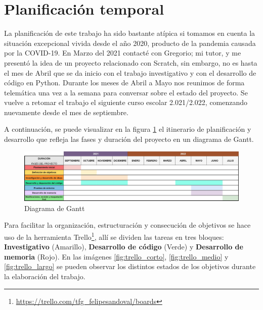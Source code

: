 \documentclass[a4paper, 12pt]{book}
\begin{document}
\section{Planificación temporal}
\label{sec:planificacion-temporal}


La planificación de este trabajo ha sido bastante atípica si tomamos en cuenta la situación excepcional vivida desde el año 2020, producto de la pandemia causada por la COVID-19. En Marzo del 2021 contacté con Gregorio; mi tutor, y me presentó la idea de un proyecto relacionado con Scratch, sin embargo, no es hasta el mes de Abril que se da inicio con el trabajo investigativo y con el desarrollo de código en Python. Durante los meses de Abril a Mayo nos reunimos de forma telemática una vez a la semana para conversar sobre el estado del proyecto. Se vuelve a retomar el trabajo el siguiente curso escolar 2.021/2.022, comenzando nuevamente desde el mes de septiembre.

A continuación, se puede visualizar en la figura \ref{fig:diagrama_gantt} el itinerario de planificación y desarrollo que refleja las fases y duración del proyecto en un diagrama de Gantt.

\begin{figure}[htb!]
	\centering
    \includegraphics[width=17cm, keepaspectratio]{img/gantt.jpg}
    \caption{Diagrama de Gantt}
    \label{fig:diagrama_gantt}
\end{figure}

\pagebreak 
Para facilitar la organización, estructuración y consecución de objetivos se hace uso de la herramienta Trello\footnote{\url{https://trello.com/tfg_felipesandoval/boards}}, allí se dividen las tareas en tres bloques: \textbf{Investigativo} (Amarillo), \textbf{Desarrollo de código} (Verde) y \textbf{Desarrollo de memoria} (Rojo). En las imágenes \ref{fig:trello_corto}, \ref{fig:trello_medio} y \ref{fig:trello_largo} se pueden observar los distintos estados de los objetivos durante la elaboración del trabajo.
\end{document}
